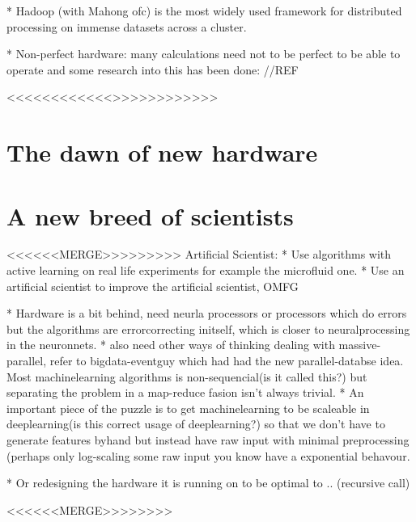 \documentclass{article}
\begin{document}
    * Hadoop (with Mahong ofc) is the most widely used framework for
    distributed processing on immense datasets across a cluster. 

    * Non-perfect hardware: many calculations need not to be perfect to be able
    to operate and some research into this has been done: //REF

<<<<<<<<<<<<>>>>>>>>>>>>

\section{The dawn of new hardware}


\section{A new breed of scientists}

<<<<<<MERGE>>>>>>>>>
    Artificial Scientist: 
    * Use algorithms with active learning on real life experiments for example the
    microfluid one.
    * Use an artificial scientist to improve the artificial scientist, OMFG

    * Hardware is a bit  behind, need neurla processors or processors which do
    errors but the algorithms are errorcorrecting initself, which is closer to
    neuralprocessing in the neuronnets.
    * also need other ways of thinking dealing with massive-parallel, refer to
    bigdata-eventguy which had had the new parallel-databse idea. Most
    machinelearning algorithms is non-sequencial(is it called this?) but separating
    the problem in a map-reduce fasion isn't always trivial.
    * An important piece of the puzzle is to get machinelearning to be scaleable in
    deeplearning(is this correct usage of deeplearning?) so that we don't have to
    generate features byhand but instead have raw input with minimal preprocessing
    (perhaps only log-scaling some raw input you know have a exponential behavour.

    * Or redesigning the hardware it is running on to be optimal to .. (recursive
    call)

<<<<<<MERGE>>>>>>>>
\end{document}
